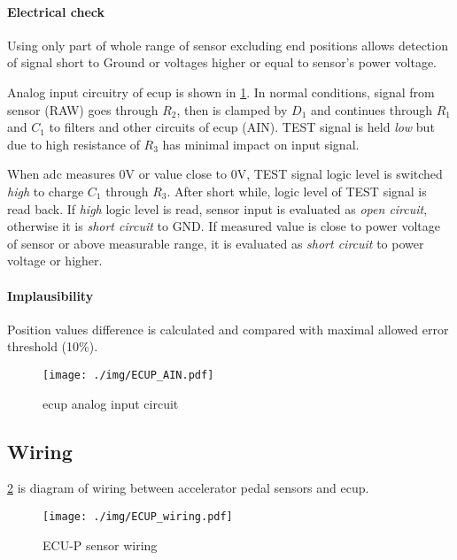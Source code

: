 \paragraph{Electrical check} 
Using only part of whole range of sensor excluding end positions allows detection of signal short to Ground or voltages higher or equal to sensor's power voltage.

Analog input circuitry of \gls{ecup} is shown in \ref{fig:ecup_analog_input}. In normal conditions, signal from sensor (RAW) goes through $R_2$, then is clamped by $D_1$ and continues through $R_1$ and $C_1$ to filters and other circuits of \gls{ecup} (AIN). TEST signal is held \textit{low} but due to high resistance of $R_3$ has minimal impact on input signal.

When \gls{adc} measures 0V or value close to 0V, TEST signal logic level is switched \textit{high} to charge $C_1$ through $R_3$. After short while, logic level of TEST signal is read back. If \textit{high} logic level is read, sensor input is evaluated as \textit{open circuit}, otherwise it is \textit{short circuit} to GND. If measured value is close to power voltage of sensor or above measurable range, it is evaluated as \textit{short circuit} to power voltage or higher.

\paragraph{Implausibility}
Position values difference is calculated and compared with maximal allowed error threshold (10\%).

\begin{figure}[H]
\begin{center}
	\texttt{[image: ./img/ECUP\_AIN.pdf]}
	\caption{\gls{ecup} analog input circuit}
	\label{fig:ecup_analog_input}
\end{center}
\end{figure}



\subsection{Wiring}
\ref{fig:ecup_wiring} is diagram of wiring between accelerator pedal sensors and \gls{ecup}.

\begin{figure}[H]
\begin{center}
	\texttt{[image: ./img/ECUP\_wiring.pdf]}
	\caption{ECU-P sensor wiring}
	\label{fig:ecup_wiring}
\end{center}
\end{figure}

